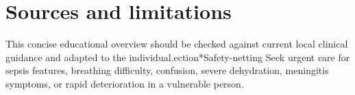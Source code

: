 \section*{Sources and limitations}
This concise educational overview should be checked against current local clinical guidance and adapted to the individual.ection*{Safety-netting}
Seek urgent care for sepsis features, breathing difficulty, confusion, severe dehydration, meningitis symptoms, or rapid deterioration in a vulnerable person.
